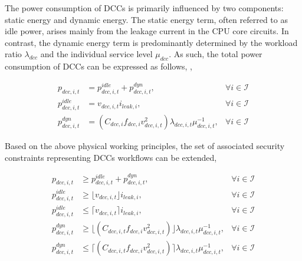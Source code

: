 \documentclass[lettersize,journal]{IEEEtran}
\begin{document}

The power consumption of DCCs is primarily influenced by two components: static energy and dynamic energy. The static energy term, often referred to as idle power, arises mainly from the leakage current in the CPU core circuits. In contrast, the dynamic energy term is predominantly determined by the workload ratio $\lambda_{dcc}$ and the individual service level $\mu_{dcc}$. As such, the total power consumption of DCCs can be expressed as follows, \cite{lin2023workload},

\vspace{-0.25cm}
\begin{subequations}
  \begin{align}
    \!\!\!\!p_{dcc,i,t} &= p_{dcc,i,t}^{idle} + p_{dcc,i,t}^{dyn},&\forall i\in\mathcal{I}\\
    \!\!\!\!p_{dcc,i,t}^{idle} &= v_{dcc,i,t} i_{leak,i},&\forall i\in\mathcal{I}\\
    \!\!\!\!p_{dcc,i,t}^{dyn} &= {\left( C_{dcc,i} f_{dcc,i} v_{dcc,i,t}^{2} \right )}{\lambda_{dcc,i,t}}{\mu_{dcc,i,t}^{-1}},\!\!\! & \forall i\in \mathcal{I}
  \end{align}
\end{subequations}

\noindent

Based on the above physical working principles, the set of associated security constraints representing DCCs workflows can be extended,

\vspace{-0.25cm}
\begin{subequations}
  \begin{align}
    \!\!\!\!p_{dcc,i,t} & \!\geq\! p_{dcc,i,t}^{idle} \!+\! p_{dcc,i,t}^{dyn},&\forall i\in\mathcal{I}\\
    \!\!\!\!p_{dcc,i,t}^{idle} & \!\geq\! \lfloor {v}_{dcc,i,t}\rfloor i_{leak,i},&\forall i\in\mathcal{I}\\
    \!\!\!\!p_{dcc,i,t}^{idle} & \!\leq\! \lceil {v}_{dcc,i,t}\rceil i_{leak,i},&\forall i \in\mathcal{I} \\
    \!\!\!\!p_{dcc,i,t}^{dyn} & \!\geq\! \lfloor ( C_{dcc,i,t} f_{dcc,i} v_{dcc,i,t}^{2} ) \rfloor {\lambda_{dcc,i,t}}{\mu_{dcc,i,t}^{-1}},&\forall i \in\mathcal{I} \\
    \!\!\!\!p_{dcc,i,t}^{dyn} & \!\leq\! \lceil ( C_{dcc,i,t} f_{dcc,i} v_{dcc,i,t}^{2} ) \rceil {\lambda_{dcc,i,t}}{\mu_{dcc,i,t}^{-1}},&\forall i \in\mathcal{I}
  \end{align}
\end{subequations}
\end{document}
